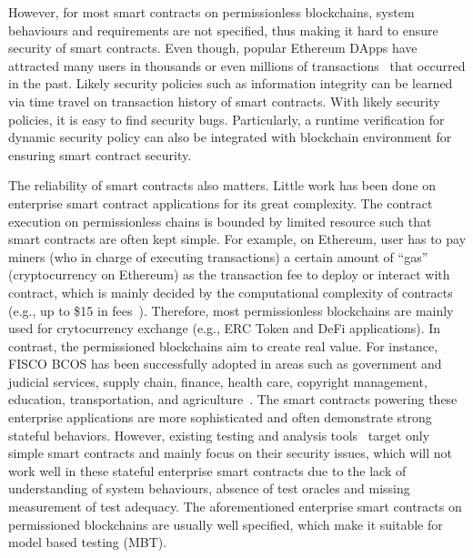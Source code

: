 However, for most smart contracts on permissionless blockchains, system behaviours and requirements are not specified, 
thus making it hard to ensure security of smart contracts.
Even though, popular Ethereum DApps have attracted many users in thousands or even millions of transactions~\cite{Etherscan} that occurred in the past.
Likely security policies such as information integrity can be learned via time travel on transaction history of smart contracts.
With likely security policies, 
it is easy to find security bugs.
Particularly, a runtime verification for dynamic security policy can also be integrated with blockchain environment for ensuring smart contract security.

The reliability of smart contracts also matters.
Little work has been done on enterprise smart contract applications for its great complexity.
The contract execution on permissionless chains is bounded by limited resource such that smart contracts are often kept simple.
For example, on Ethereum, user has to pay miners (who in charge of executing transactions) a certain amount of ``gas'' (cryptocurrency on Ethereum) as the transaction fee to deploy or interact with contract, which is mainly decided by the computational complexity of contracts (e.g., up to \$15 in fees~\cite{gas-fee}).
Therefore, most permissionless blockchains are mainly used for crytocurrency exchange (e.g., ERC Token and DeFi applications).
In contrast, the permissioned blockchains aim to create real value.
For instance, FISCO BCOS has been successfully adopted in areas such as government and judicial services, supply chain, finance, health care, copyright management, education, transportation, and agriculture~\cite{fisco}.
The smart contracts powering these enterprise applications are more sophisticated and often demonstrate strong stateful behaviors.
However, existing testing and analysis tools~\cite{jiang2018contractfuzzer,oyente,securify,SmartCheck,wang2019vultron} target only simple smart contracts and mainly focus on their security issues, which will not work well in these stateful enterprise smart contracts due to the lack of understanding of system behaviours, absence of test oracles and missing measurement of test adequacy.
The aforementioned enterprise smart contracts on permissioned blockchains are usually well specified, which make it suitable for model based testing (MBT).


